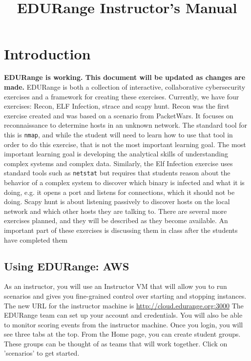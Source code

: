 \documentclass[11pt]{report}
\begin{document}
\title{EDURange Instructor's Manual}
\maketitle

%  
\section{Introduction}
\label{sec:intro}
{\bf  EDURange is working.  This document will be updated as changes are made.}
EDURange is both a collection of interactive, collaborative cybersecurity exercises and a framework 
for creating these exercises.  Currently, we have four exercises:  Recon, ELF Infection, strace and scapy hunt.
Recon was the first exercise created and was based on a scenario from PacketWars.  It
focuses on reconnaissance to determine hosts in an unknown network.  The standard tool for this is 
{\tt nmap}, and while the student will need to learn how to use that tool in order to do this exercise, 
that is
not the most important learning goal. The most important learning goal is developing the
analytical skills of understanding complex systems and complex data.  Similarly, the Elf Infection 
exercise uses standard tools such as {\tt netstat} but requires that students
reason about the behavior of a complex system to discover which binary is infected and 
what it is doing, e.g.
it opens a port and listens for connections, which it should not be doing.  
Scapy hunt is about listening passively to discover hosts on the local network and 
which other hosts they are talking to.
There are several more exercises planned, and they will be described as they become available.
An important part of these exercises is discussing them in class after the students have 
completed them



\subsection{Using EDURange: AWS}
As an instructor, you will use an Instructor VM that will allow you to run scenarios
and gives you fine-grained control over starting and stopping instances.
The new URL for the instructor machine is \url{http://cloud.edurange.org:3000}
The EDURange team can set up your account and credentials.
You will also be able to monitor scoring events from the instructor machine.
Once you login, you will see three tabs at the top.  From the Home page,
you can create student groups.  These groups can be thought of as teams that will work
together. %
Click on 'scenarios' to get started.
\end{document}

